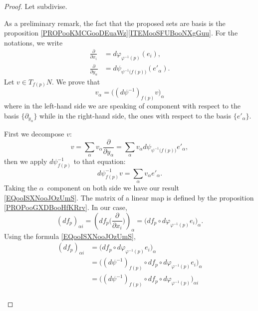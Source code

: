 \begin{proof}
	Let subdivise.
	\begin{subproof}
		\spitem[Notations]
		As a preliminary remark, the fact that the proposed sets are basis is the proposition \ref{PROPooKMCGooDEuaWz}\ref{ITEMooSFUBooNXgGuu}. For the notations, we write
		\begin{subequations}
			\begin{align}
				\frac{ \partial  }{ \partial x_i }        & =d\varphi_{\varphi^{-1}(p)}(e_i),                \\
				\frac{ \partial  }{ \partial y_{\alpha} } & =d\psi_{\psi^{-1}\big( f(p) \big)}(e'_{\alpha}).
			\end{align}
		\end{subequations}
		\spitem[Component]
		Let \( v\in T_{f(p)}N\). We prove that
		\begin{equation}        \label{EQooISXNooJOzUmS}
			v_{\alpha}=\Big( (d\psi^{-1})_{f(p)}v \Big)_{\alpha}
		\end{equation}
		where in the left-hand side we are speaking of component with respect to the basis \( \{ \partial_{y_{\alpha}} \}\) while in the right-hand side, the ones with respect to the basis \( \{ e'_{\alpha} \}\).

		First we decompose \( v\):
		\begin{equation}
			v=\sum_{\alpha}v_{\alpha}\frac{ \partial  }{ \partial y_{\alpha} }=\sum_{\alpha}v_{\alpha}d\psi_{\psi^{-1}\big( f(p) \big)}e'_{\alpha},
		\end{equation}
		then we apply \( d\psi^{-1}_{f(p)}\) to that equation:
		\begin{equation}
			d\psi^{-1}_{f(p)}v=\sum_{\alpha}v_{\alpha}e'_{\alpha}.
		\end{equation}
		Taking the \( \alpha\)\th\ component on both side we have our result \eqref{EQooISXNooJOzUmS}.
		\spitem[Matrix]
		The matrix of a linear map is defined by the proposition \ref{PROPooGXDBooHfKRrv}. In our case,
		\begin{equation}
			(df_p)_{\alpha i}=\left( df_p\big( \frac{ \partial  }{ \partial x_i } \big) \right)_{\alpha} =\Big( df_p\circ d\varphi_{\varphi^{-1}(p)}e_i \Big)_{\alpha}.
		\end{equation}
		Using the formula \eqref{EQooISXNooJOzUmS},
		\begin{subequations}
			\begin{align}
				(df_p)_{\alpha i} & =\Big( df_p\circ d\varphi_{\varphi^{-1}(p)}e_i \Big)_{\alpha}                          \\
				                  & =\big( (d\psi^{-1})_{f(p)}\circ df_p\circ d\varphi_{\varphi^{-1}(p)}e_i \big)_{\alpha} \\
				                  & =\big( (d\psi^{-1})_{f(p)}\circ df_p\circ d\varphi_{\varphi^{-1}(p)} \big)_{\alpha i}  \\
			\end{align}
		\end{subequations}
	\end{subproof}
\end{proof}


